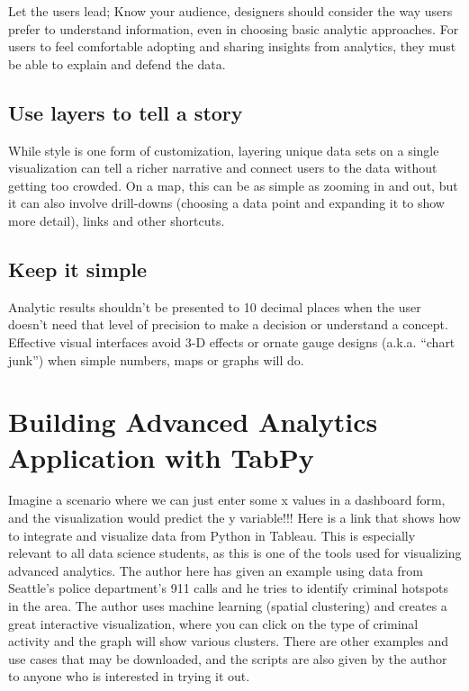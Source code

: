 \documentclass[]{book}
\theoremstyle{definition}
\theoremstyle{definition}
\theoremstyle{definition}
\theoremstyle{remark}
\begin{document}
Let the users lead; Know your audience, designers should consider the
way users prefer to understand information, even in choosing basic
analytic approaches. For users to feel comfortable adopting and sharing
insights from analytics, they must be able to explain and defend the
data.

\subsection{Use layers to tell a
story}\label{use-layers-to-tell-a-story}

While style is one form of customization, layering unique data sets on a
single visualization can tell a richer narrative and connect users to
the data without getting too crowded. On a map, this can be as simple as
zooming in and out, but it can also involve drill-downs (choosing a data
point and expanding it to show more detail), links and other shortcuts.

\subsection{Keep it simple}\label{keep-it-simple-1}

Analytic results shouldn't be presented to 10 decimal places when the
user doesn't need that level of precision to make a decision or
understand a concept. Effective visual interfaces avoid 3-D effects or
ornate gauge designs (a.k.a. ``chart junk'') when simple numbers, maps
or graphs will do.

\section{Building Advanced Analytics Application with
TabPy}\label{building-advanced-analytics-application-with-tabpy-1}

\citep{TabPy}

Imagine a scenario where we can just enter some x values in a dashboard
form, and the visualization would predict the y variable!!! Here is a
link that shows how to integrate and visualize data from Python in
Tableau. This is especially relevant to all data science students, as
this is one of the tools used for visualizing advanced analytics. The
author here has given an example using data from Seattle's police
department's 911 calls and he tries to identify criminal hotspots in the
area. The author uses machine learning (spatial clustering) and creates
a great interactive visualization, where you can click on the type of
criminal activity and the graph will show various clusters. There are
other examples and use cases that may be downloaded, and the scripts are
also given by the author to anyone who is interested in trying it out.
\end{document}

